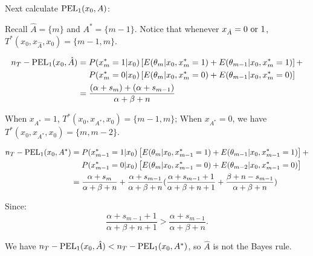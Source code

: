 \documentclass[12pt]{article}
\begin{document}
Next calculate ${\rm PEL}_1(x_0,A)$:

Recall $\hat{A} = \{m\}$ and $A^* = \{m-1\}$. Notice that whenever $x_{\hat{A}} = 0~ {\rm or} ~1$, $T^*(x_0,x_{\hat{A}},x_0) = \{m-1,m\}$. 

\begin{align*}
    n_T - {\rm PEL}_1(x_0, \hat{A}) &= P(x_m^* = 1|x_0)\left[E(\theta_m|x_0,x_m^* = 1) + E(\theta_{m-1}|x_0, x_m^* = 1)\right] +\\ &~~~~P(x_m^* = 0|x_0)\left[E(\theta_m|x_0,x_m^* = 0) + E(\theta_{m-1}|x_0, x_m^* = 0)\right]\\
    &= \frac{(\alpha + s_m) + (\alpha+s_{m-1})}{\alpha+\beta+n}
\end{align*}

When $x_{A^*} = 1$, $T^*(x_0,x_{A^*},x_0) = \{m-1,m\}$; When $x_{A^*} = 0$,
we have $T^*(x_0,x_{A^*},x_0) = \{m,m-2\}$.

\begin{align*}
    n_T - {\rm PEL}_1(x_0, A^*) &= P(x_{m-1}^* = 1|x_0)\left[E(\theta_m|x_0,x_{m-1}^* = 1) + E(\theta_{m-1}|x_0, x_{m-1}^* = 1)\right] +\\ &~~~~P(x_{m-1}^* = 0|x_0)\left[E(\theta_m|x_0,x_{m-1}^* = 0) + E(\theta_{m-2}|x_0, x_{m-1}^* = 0)\right]\\
    &= \frac{\alpha + s_m}{\alpha+\beta+n} + \frac{\alpha+s_{m-1}}{\alpha+\beta+n}(\frac{\alpha+s_{m-1}+ 1}{\alpha+\beta+n+1} + \frac{\beta+n-s_{m-1}}{\alpha+\beta+n})
\end{align*}

Since:
$$
\frac{\alpha+s_{m-1}+1}{\alpha+\beta+n+1} > \frac{\alpha+s_{m-1}}{\alpha+\beta+n}.
$$

We have 
$n_T - {\rm PEL}_1(x_0, \hat{A}) <n_T - {\rm PEL}_1(x_0, A^*)$, 
so $\hat{A}$ is not the Bayes rule.

\onehalfspacing






\end{document}
